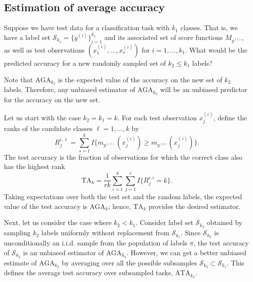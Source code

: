 \documentclass[twoside,11pt]{article}
\begin{document}
\subsection{Estimation of average accuracy}\label{sec:estimation_average_accuracy}

Suppose we have test data for a classification task with $k_1$
classes.  That is, we have a label set $\mathcal{S}_{k_1} =
\{y^{(i)}\}_{i=1}^{k_1}$ and its associated set of score functions
$M_{y^{(i)}}$, as well as test observations $(x_1^{(i)},\hdots,
x_{r}^{(i)})$ for $i = 1,\hdots, k_1$.  What would be the predicted
accuracy for a new randomly sampled set of $k_2 \leq k_1$ labels?

Note that $\text{AGA}_{k_2}$ is the expected value of the accuracy on
the new set of $k_2$ labels.  Therefore, any unbiased estimator of
$\text{AGA}_{k_2}$ will be an unbiased predictor for the accuracy on
the new set.

Let us start with the case $k_2 = k_1 = k$.  For each test observation
$x_j^{(i)}$, define the ranks of the candidate classes $\ell =
1,\hdots, k$ by
\[
R_{j}^{i, \ell} = \sum_{s = 1}^k I\{m_{y^{(\ell)}}(x_j^{(i)}) \geq m_{y^{(s)}}(x_j^{(i)})\}.
\]
The test accuracy is the fraction of observations for which the
correct class also has the highest rank
\begin{equation}\label{eq:test_risk}
\text{TA}_k = \frac{1}{r k} \sum_{i=1}^{k} \sum_{j=1}^{r} I\{R_j^{i,i} = k\}.
\end{equation}
Taking expectations over both the test set and the random labels, the
expected value of the test accuracy is $\text{AGA}_k$; hence,
$\text{TA}_k$ provides the desired estimator.

Next, let us consider the case where $k_2 < k_1$.  Consider label set
$\mathcal{S}_{k_2}$ obtained by sampling $k_2$ labels uniformly
without replacement from $\mathcal{S}_{k_1}$. Since
$\mathcal{S}_{k_2}$ is unconditionally an i.i.d. sample from the
population of labels $\pi$, the test accuracy of $\mathcal{S}_{k_2}$
is an unbiased estimator of $\text{AGA}_{k_2}$.  However, we can get a
better unbiased estimate of $\text{AGA}_{k_2}$ by averaging over all
the possible subsamples $\mathcal{S}_{k_2} \subset \mathcal{S}_{k_1}$.
This defines the average test accuracy over subsampled tasks,
$\text{ATA}_{k_2}$.
\end{document}
